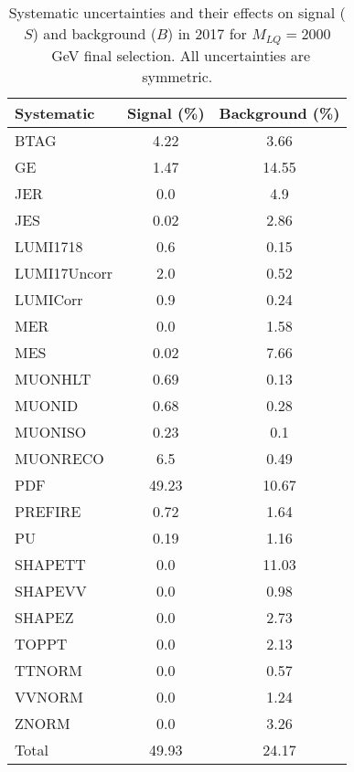 \begin{table}[htbp]
\begin{center}
\caption{Systematic uncertainties and their effects on signal ($S$) and background ($B$) in 2017 for $M_{LQ}=2000$~GeV final selection. All uncertainties are symmetric.}
\begin{tabular}{lcc}
\hline\hline
Systematic & Signal (\%) & Background (\%) \\ \hline 
BTAG & 4.22 & 3.66\\ 
GE & 1.47 & 14.55\\ 
JER & 0.0 & 4.9\\ 
JES & 0.02 & 2.86\\ 
LUMI1718 & 0.6 & 0.15\\ 
LUMI17Uncorr & 2.0 & 0.52\\ 
LUMICorr & 0.9 & 0.24\\ 
MER & 0.0 & 1.58\\ 
MES & 0.02 & 7.66\\ 
MUONHLT & 0.69 & 0.13\\ 
MUONID & 0.68 & 0.28\\ 
MUONISO & 0.23 & 0.1\\ 
MUONRECO & 6.5 & 0.49\\ 
PDF & 49.23 & 10.67\\ 
PREFIRE & 0.72 & 1.64\\ 
PU & 0.19 & 1.16\\ 
SHAPETT & 0.0 & 11.03\\ 
SHAPEVV & 0.0 & 0.98\\ 
SHAPEZ & 0.0 & 2.73\\ 
TOPPT & 0.0 & 2.13\\ 
TTNORM & 0.0 & 0.57\\ 
VVNORM & 0.0 & 1.24\\ 
ZNORM & 0.0 & 3.26\\ 
Total & 49.93 & 24.17\\ \hline \hline
\end{tabular}
\label{tab:SysUncertainties_uujj_2000}
\end{center}
\end{table}

